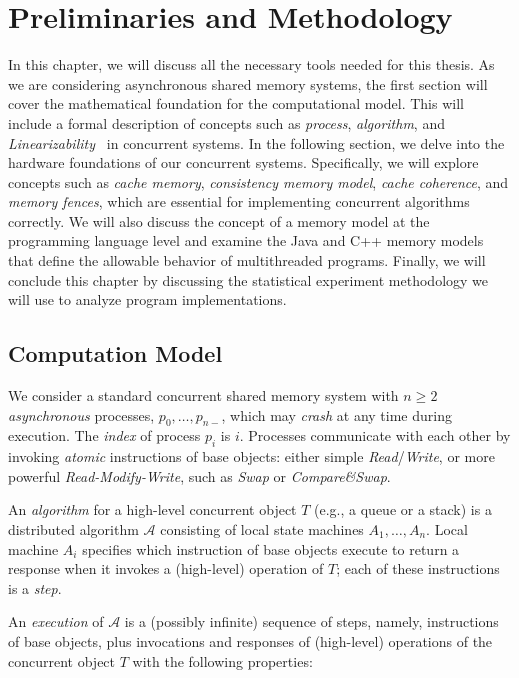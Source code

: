 \chapter{\label{chapter:3_preliminaries}Preliminaries and Methodology}

In this chapter, we will discuss all the necessary tools needed for this thesis. As we are considering asynchronous shared memory systems, the first section will cover the mathematical foundation for the computational model. This will include a formal description of concepts such as \emph{process},  \emph{algorithm}, and \emph{Linearizability~\cite{DBLP_journals_toplas_HerlihyW90}} in concurrent systems. In the following section, we delve into the hardware foundations of our concurrent systems. Specifically, we will explore concepts such as \emph{cache memory}, \emph{consistency memory model}, \emph{cache coherence}, and \emph{memory fences}, which are essential for implementing concurrent algorithms correctly. We will also discuss the concept of a memory model at the programming language level and examine the Java and C++ memory models that define the allowable behavior of multithreaded programs. Finally, we will conclude this chapter by discussing the statistical experiment methodology we will use to analyze program implementations.

\section{\label{sec:computation-model}Computation Model}

We consider a standard concurrent shared memory system with \(n \ge 2\) \textit{asynchronous} processes, \(p_0, \ldots, p_{n-}\), which may \textit{crash} at any time during execution. The \textit{index} of process \(p_i\) is \(i\). Processes communicate with each other by invoking \textit{atomic} instructions of base objects: either simple \emph{Read}/\emph{Write}, or more powerful \emph{Read-Modify-Write}, such as \emph{Swap} or \emph{Compare\&Swap}.

An \emph{algorithm} for a high-level concurrent object \(T\) (e.g., a queue or a stack) is a distributed algorithm \(\mathcal{A}\) consisting of local state machines \(A_1,\ldots, A_n\). Local machine \(A_i\) specifies which instruction of base objects execute to return a response when it invokes a (high-level) operation of \(T\); each of these instructions is a \emph{step}.

An \emph{execution} of \(\mathcal{A}\) is a (possibly infinite) sequence of steps, namely, instructions of base objects, plus invocations and responses of (high-level) operations of the concurrent object \(T\) with the following properties:

